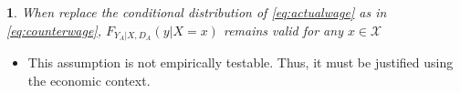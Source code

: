 \documentclass[a4paper, 12pt]{article}
\makeatletter
\newtheorem*{assumption*}{\assumptionnumber}
\providecommand{\assumptionnumber}{}
\newenvironment{assumption}[2]
 {%
  \renewcommand{\assumptionnumber}{Assumption #1 \textit{(#2)}}%
  \begin{assumption*}%
  \protected@edef\@currentlabel{#1}%
 }
 {%
  \end{assumption*}
 }
\makeatother
\begin{document}
\begin{assumption}{6}{Invariance of Conditional Distributions}
When replace the conditional distribution of \eqref{eq:actualwage} as in \eqref{eq:counterwage}, $F_{Y_A|X,D_A}(y|X=x)$ remains valid for any $x \in \mathcal{X}$
\end{assumption}

\begin{itemize}
\item This assumption is not empirically testable. Thus, it must be justified using the economic context.
\end{itemize}


 
\end{document}
